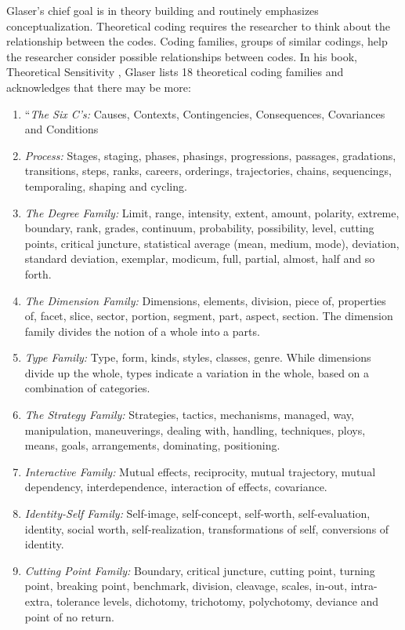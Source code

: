 Glaser's chief goal is in theory building and routinely emphasizes conceptualization. Theoretical coding requires the researcher to think about the relationship between the codes. Coding families, groups of similar codings, help the researcher consider possible relationships between codes.  In his book, Theoretical Sensitivity \cite{GlaserTheoreticalSensitivity}, Glaser lists 18 theoretical coding families and acknowledges that there may be more:
\begin{enumerate}
\item ``\textit{The Six C's:} Causes, Contexts, Contingencies, Consequences, Covariances and Conditions
\item \textit{Process:} Stages, staging, phases, phasings, progressions, passages, gradations, transitions, steps, ranks, careers, orderings, trajectories, chains, sequencings, temporaling, shaping and cycling.
\item \textit{The Degree Family:} Limit, range, intensity, extent, amount, polarity, extreme, boundary, rank, grades, continuum, probability, possibility, level, cutting points, critical juncture, statistical average (mean, medium, mode), deviation, standard deviation, exemplar, modicum, full, partial, almost, half and so forth.
\item \textit{The Dimension Family:} Dimensions, elements, division, piece of, properties of, facet, slice, sector, portion, segment, part, aspect, section. The dimension family divides the notion of a whole into a parts. 
\item \textit{Type Family:} Type, form, kinds, styles, classes, genre. While dimensions divide up the whole, types indicate a variation in the whole, based on a combination of categories. 
\item \textit{The Strategy Family:} Strategies, tactics, mechanisms, managed, way, manipulation, maneuverings, dealing with, handling, techniques, ploys, means, goals, arrangements, dominating, positioning. 
\item \textit{Interactive Family:} Mutual effects, reciprocity, mutual trajectory, mutual dependency, interdependence, interaction of effects, covariance. 
\item \textit{Identity-Self Family:} Self-image, self-concept, self-worth, self-evaluation, identity, social worth, self-realization, transformations of self, conversions of identity.
\item \textit{Cutting Point Family:} Boundary, critical juncture, cutting point, turning point, breaking point, benchmark, division, cleavage, scales, in-out, intra-extra, tolerance levels, dichotomy, trichotomy, polychotomy, deviance and point of no return.

\end{enumerate}
